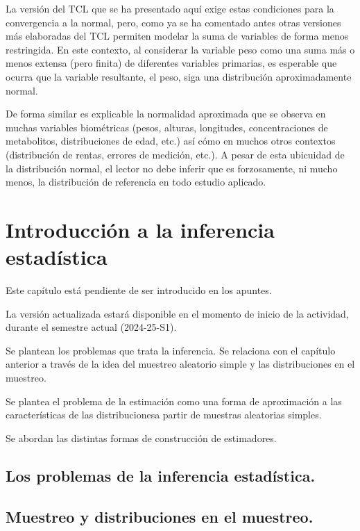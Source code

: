 \documentclass[
]{article}
\begin{document}
La versión del TCL que se ha presentado aquí exige estas condiciones para la convergencia a la normal, pero, como ya se ha comentado antes otras versiones más elaboradas del TCL permiten modelar la suma de variables de forma menos restringida. En este contexto, al considerar la variable peso como una suma más o menos extensa (pero finita) de diferentes variables primarias, es esperable que ocurra que la variable resultante, el peso, siga una distribución aproximadamente normal.

De forma similar es explicable la normalidad aproximada que se observa en muchas variables biométricas (pesos, alturas, longitudes, concentraciones de metabolitos, distribuciones de edad, etc.) así cómo en muchos otros contextos (distribución de rentas, errores de medición, etc.). A pesar de esta ubicuidad de la distribución normal, el lector no debe inferir que es forzosamente, ni mucho menos, la distribución de referencia en todo estudio aplicado.

\section{Introducción a la inferencia estadística}\label{introducciuxf3n-a-la-inferencia-estaduxedstica}

Este capítulo está pendiente de ser introducido en los apuntes.

La versión actualizada estará disponible en el momento de inicio de la actividad, durante el semestre actual (2024-25-S1).

Se plantean los problemas que trata la inferencia. Se relaciona con el capítulo anterior a través de la idea del muestreo aleatorio simple y las distribuciones en el muestreo.

Se plantea el problema de la estimación como una forma de aproximación a las características de las distribucionesa partir de muestras aleatorias simples.

Se abordan las distintas formas de construcción de estimadores.

\subsection{Los problemas de la inferencia estadística.}\label{los-problemas-de-la-inferencia-estaduxedstica.}

\subsection{Muestreo y distribuciones en el muestreo.}\label{muestreo-y-distribuciones-en-el-muestreo.}
\end{document}
